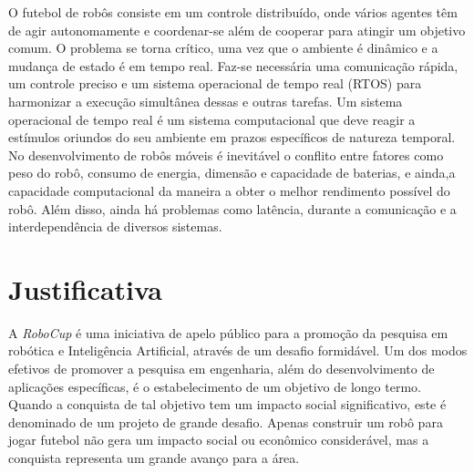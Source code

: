O futebol de robôs consiste em um controle distribuído, onde vários agentes têm de agir autonomamente e coordenar-se além de cooperar para atingir um objetivo comum. O problema se torna crítico, uma vez que o ambiente é dinâmico e  a mudança de estado é em tempo real. Faz-se necessária uma comunicação rápida, um controle preciso e um sistema operacional de tempo real  (RTOS) para harmonizar a execução simultânea dessas e outras tarefas. Um sistema operacional de tempo real é um sistema computacional que deve reagir a estímulos oriundos do seu ambiente em prazos específicos de natureza temporal. No desenvolvimento de robôs móveis é inevitável o conflito entre fatores como peso do robô, consumo de energia, dimensão e capacidade de baterias, e ainda,a capacidade computacional da maneira a obter o melhor rendimento possível do robô. Além disso, ainda há problemas como latência, durante a comunicação e a interdependência de diversos sistemas. 

\section{Justificativa}

%

A \textit{RoboCup} é uma iniciativa de apelo público para a promoção da pesquisa em robótica e Inteligência Artificial, através de um desafio formidável. Um dos modos efetivos de promover a pesquisa em engenharia, além do desenvolvimento de aplicações específicas, é o estabelecimento de um objetivo de longo termo. Quando a conquista de tal objetivo tem um impacto social significativo, este é denominado de um projeto de grande desafio. Apenas construir um robô para jogar futebol não gera um impacto social ou econômico considerável, mas a conquista representa um grande avanço para a área. 

